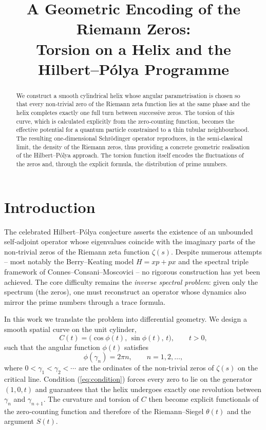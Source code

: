\documentclass[12pt,a4paper]{article}
\title{\bf A Geometric Encoding of the Riemann Zeros:\\ Torsion on a Helix and the Hilbert--P\'olya Programme}
\author{}
\date{}
\begin{document}
\maketitle

\begin{abstract}
We construct a smooth cylindrical helix whose angular parametrisation is chosen so that every non‑trivial zero of the Riemann zeta function lies at the same phase and the helix completes exactly one full turn between successive zeros. The torsion of this curve, which is calculated explicitly from the zero‑counting function, becomes the effective potential for a quantum particle constrained to a thin tubular neighbourhood. The resulting one‑dimensional Schr\"odinger operator reproduces, in the semi‑classical limit, the density of the Riemann zeros, thus providing a concrete geometric realisation of the Hilbert--P\'olya approach. The torsion function itself encodes the fluctuations of the zeros and, through the explicit formula, the distribution of prime numbers.
\end{abstract}

\section{Introduction}
The celebrated Hilbert--P\'olya conjecture asserts the existence of an unbounded self‑adjoint operator whose eigenvalues coincide with the imaginary parts of the non‑trivial zeros of the Riemann zeta function $\zeta(s)$. Despite numerous attempts – most notably the Berry--Keating model $H = xp +px$ and the spectral triple framework of Connes--Consani--Moscovici – no rigorous construction has yet been achieved. The core difficulty remains the \emph{inverse spectral problem}: given only the spectrum (the zeros), one must reconstruct an operator whose dynamics also mirror the prime numbers through a trace formula.

In this work we translate the problem into differential geometry. We design a smooth spatial curve on the unit cylinder,
\begin{equation}
  C(t) = \bigl( \cos\phi(t),\, \sin\phi(t),\, t \bigr),\qquad t>0,
  \label{eq:helix}
\end{equation}
such that the angular function $\phi(t)$ satisfies
\begin{equation}
  \phi(\gamma_n)=2\pi n,\qquad n=1,2,\dots,
  \label{eq:condition}
\end{equation}
where $0<\gamma_1<\gamma_2<\cdots$ are the ordinates of the non‑trivial zeros of $\zeta(s)$ on the critical line. Condition (\ref{eq:condition}) forces every zero to lie on the generator $(1,0,t)$ and guarantees that the helix undergoes exactly one revolution between $\gamma_n$ and $\gamma_{n+1}$. The curvature and torsion of $C$ then become explicit functionals of the zero‑counting function and therefore of the Riemann--Siegel $\theta(t)$ and the argument $S(t)$.
\end{document}

